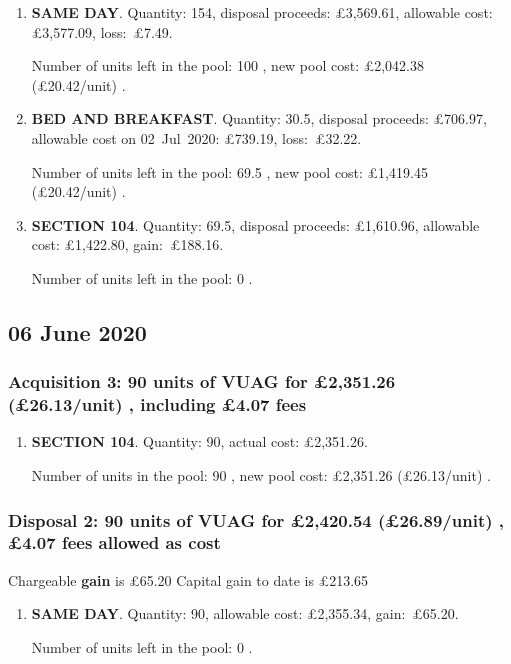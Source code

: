 \documentclass{article}
\begin{document}
\begin{enumerate}
\item \textbf{SAME DAY}. Quantity: 154,
    disposal proceeds: £3,569.61,
    allowable
    cost:
    £3,577.09,
    \mbox{loss: £7.49.}

    Number of units left in the pool:
    100%
,
    new pool cost: £2,042.38
    (£20.42/unit)%
.

\item \textbf{BED AND BREAKFAST}. Quantity: 30.5,
    disposal proceeds: £706.97,
    allowable
    cost on \mbox{02 Jul 2020:}
    £739.19,
    \mbox{loss: £32.22.}

    Number of units left in the pool:
    69.5%
,
    new pool cost: £1,419.45
    (£20.42/unit)%
.

\item \textbf{SECTION 104}. Quantity: 69.5,
    disposal proceeds: £1,610.96,
    allowable
    cost:
    £1,422.80,
    \mbox{gain: £188.16.}

    Number of units left in the pool:
    0%
.

\end{enumerate}



\subsection*{06 June 2020}
\subsubsection*{
    Acquisition 3: 90 units of VUAG for £2,351.26
    (£26.13/unit)%
    , including £4.07 fees
}

\begin{enumerate}
\item \textbf{SECTION 104}. Quantity: 90,
    actual cost: £2,351.26.

    Number of units in the pool:
    90%
,
    new pool cost: £2,351.26
    (£26.13/unit)%
.

\end{enumerate}

\subsubsection*{
    Disposal 2: 90 units of VUAG
for £2,420.54
    (£26.89/unit)%
    , £4.07 fees allowed as cost
}
Chargeable \textbf{gain} is £65.20
Capital gain to date is £213.65

\begin{enumerate}
\item \textbf{SAME DAY}. Quantity: 90,
    allowable
    cost:
    £2,355.34,
    \mbox{gain: £65.20.}

    Number of units left in the pool:
    0%
.

\end{enumerate}
\end{document}
